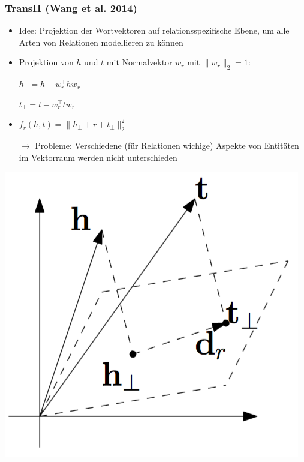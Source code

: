 \documentclass[10pt,xcolor={usenames,dvipsnames,svgnames,table}]{beamer}
\begin{document}
\begin{frame}
	\frametitle{TransH (Wang et al. 2014)}
	\begin{itemize}
		\item Idee: Projektion der Wortvektoren auf relationsspezifische Ebene, um alle Arten von Relationen modellieren zu können
		\item Projektion von $h$ und $t$ mit Normalvektor $w_r$ mit $\|w_r\|_2=1$:
		\item[] $h_\bot = h - w_r^\top hw_r$
		\item[] $t_\bot = t - w_r^\top tw_r$
		\item $f_r(h, t) = \|h_\bot + r + t_\bot\|^2_2$
		\item[$\rightarrow$ ] Probleme: Verschiedene (für Relationen wichige) Aspekte von Entitäten im Vektorraum werden nicht unterschieden
	\end{itemize}
	\begin{center}
		\includegraphics[scale=0.20]{./img/transh.png}
	\end{center}
\end{frame}
\end{document}
